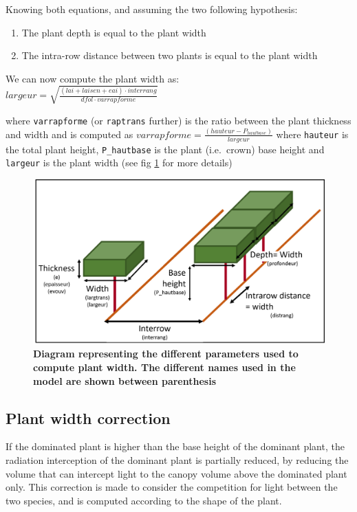 \documentclass[]{book}
\providecommand{\tightlist}{%
  \setlength{\itemsep}{0pt}\setlength{\parskip}{0pt}}
\theoremstyle{definition}
\theoremstyle{definition}
\theoremstyle{definition}
\theoremstyle{remark}
\begin{document}
Knowing both equations, and assuming the two following hypothesis:

\begin{enumerate}
\def\labelenumi{\arabic{enumi}.}
\tightlist
\item
  The plant depth is equal to the plant width
\item
  The intra-row distance between two plants is equal to the plant width
\end{enumerate}

We can now compute the plant width as:\\
\(largeur=\sqrt{\frac{(lai+laisen+eai)\cdot interrang}{dfol\cdot varrapforme}}\)

where \texttt{varrapforme} (or \texttt{raptrans} further) is the ratio
between the plant thickness and width and is computed as
\(varrapforme=\frac{(hauteur-P_{hautbase})}{largeur}\) where
\texttt{hauteur} is the total plant height, \texttt{P\_hautbase} is the
plant (i.e.~crown) base height and \texttt{largeur} is the plant width
(see fig \ref{fig:Width} for more details)

\begin{figure}
\centering
\includegraphics{img/Light-interception-dominant-1.png}
\caption{\label{fig:Width}\textbf{Diagram representing the different
parameters used to compute plant width. The different names used in the
model are shown between parenthesis}}
\end{figure}

\subsection{Plant width correction}\label{plant-width-correction}

If the dominated plant is higher than the base height of the dominant
plant, the radiation interception of the dominant plant is partially
reduced, by reducing the volume that can intercept light to the canopy
volume above the dominated plant only. This correction is made to
consider the competition for light between the two species, and is
computed according to the shape of the plant.
\end{document}
